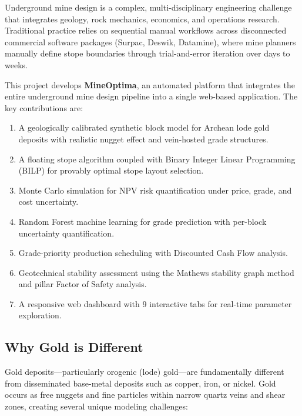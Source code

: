 \documentclass[12pt,a4paper]{article}
\begin{document}
Underground mine design is a complex, multi-disciplinary engineering challenge that integrates geology, rock mechanics, economics, and operations research. Traditional practice relies on sequential manual workflows across disconnected commercial software packages (Surpac, Deswik, Datamine), where mine planners manually define stope boundaries through trial-and-error iteration over days to weeks.

This project develops \textbf{MineOptima}, an automated platform that integrates the entire underground mine design pipeline into a single web-based application. The key contributions are:

\begin{enumerate}[itemsep=0.3em]
    \item A geologically calibrated synthetic block model for Archean lode gold deposits with realistic nugget effect and vein-hosted grade structures.
    \item A floating stope algorithm coupled with Binary Integer Linear Programming (BILP) for provably optimal stope layout selection.
    \item Monte Carlo simulation for NPV risk quantification under price, grade, and cost uncertainty.
    \item Random Forest machine learning for grade prediction with per-block uncertainty quantification.
    \item Grade-priority production scheduling with Discounted Cash Flow analysis.
    \item Geotechnical stability assessment using the Mathews stability graph method and pillar Factor of Safety analysis.
    \item A responsive web dashboard with 9 interactive tabs for real-time parameter exploration.
\end{enumerate}

\subsection{Why Gold is Different}

Gold deposits---particularly orogenic (lode) gold---are fundamentally different from disseminated base-metal deposits such as copper, iron, or nickel. Gold occurs as free nuggets and fine particles within narrow quartz veins and shear zones, creating several unique modeling challenges:
\end{document}
